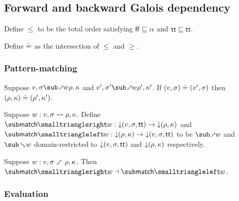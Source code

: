 \subsection{Forward and backward Galois dependency}



\begin{definition}
   Define $\leq$ to be the total order satisfying $\mathsf{ff} \sqsubseteq \alpha$ and $\mathsf{tt} \sqsubseteq \mathsf{tt}$.
\end{definition}

\begin{definition}
   Define $\doteq$ as the intersection of $\leq$ and $\geq$.
\end{definition}




\subsubsection{Pattern-matching}




\begin{lemma}
   Suppose $v, \sigma \matchFwdR{w} \rho, \kappa$ and $v', \sigma' \matchFwdR{w} \rho', \kappa'$. If $(v, \sigma) \doteq (v', \sigma)$ then $(\rho, \kappa) \doteq (\rho', \kappa')$.
\end{lemma}

\begin{definition}
   Suppose $w: v, \sigma \rightsquigarrow \rho, \kappa$. Define $\matchFwdF{w}: \Below{(v,\sigma,\TT)} \to \Below{(\rho,\kappa)}$ and $\matchBwdF{w}: \Below{(\rho,\kappa)} \to \Below{(v,\sigma,\TT)}$ to be $\matchFwdR{w}$ and $\matchBwdR{w}$ domain-restricted to ${\downarrow}{(v,\sigma,\mathsf{tt})}$ and ${\downarrow}{(\rho,\kappa)}$ respectively.
\end{definition}

\begin{theorem}
\label{thm:core-language:match:gc}
   Suppose $w: v, \sigma \matchFwdS \rho, \kappa$.  Then $\matchFwdF{w} \adjoint \matchBwdF{w}$.
\end{theorem}

\subsubsection{Evaluation}

